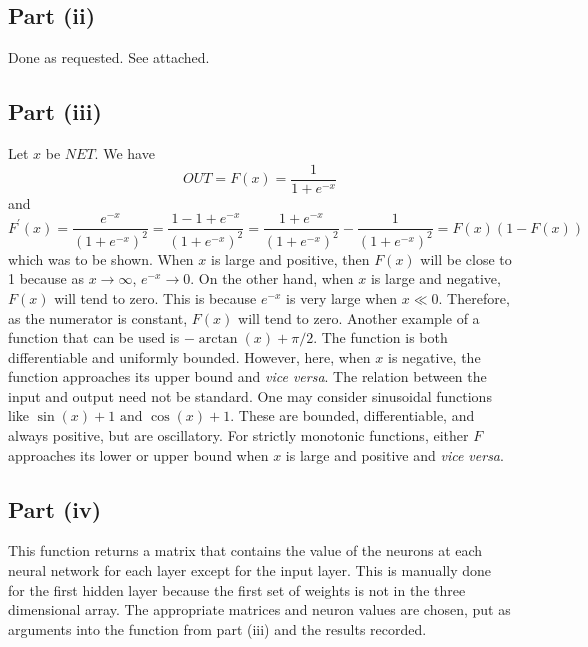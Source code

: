 \documentclass[12pt]{article}
\begin{document}
\subsection*{Part (ii)}
Done as requested.  
See attached.

\subsection*{Part (iii)}
Let $x$ be $NET$.
We have 
\[OUT = F(x) = \frac{1}{1+e^{-x}}\]
and
\[F^\prime(x) = \frac{e^{-x}}{(1+e^{-x})^2} = \frac{1-1+e^{-x}}{(1+e^{-x})^2} = \frac{1+e^{-x}}{(1+e^{-x})^2} -\frac{1}{(1+e^{-x})^2} = F(x)(1-F(x))\]
which was to be shown.
When $x$ is large and positive, then $F(x)$ will be close to 1 because as $x\rightarrow\infty$, $e^{-x}\rightarrow 0$.
On the other hand, when $x$ is large and negative, $F(x)$ will tend to zero.
This is because $e^{-x}$ is very large when $x\ll 0$.
Therefore, as the numerator is constant, $F(x)$ will tend to zero.
Another example of a function that can be used is $-\arctan\left(x\right) + \pi/2$.
The function is both differentiable and uniformly bounded.
However, here, when $x$ is negative, the function approaches its upper bound and \textit{vice versa}.
The relation between the input and output need not be standard.
One may consider sinusoidal functions like $\sin(x)+1 \text{ and }\cos(x)+1$.
These are bounded, differentiable, and always positive, but are oscillatory.
For strictly monotonic functions, either $F$ approaches its lower or upper bound when $x$ is large and positive and \textit{vice versa}.
\subsection*{Part (iv)}
This function returns a matrix that contains the value of the neurons at each neural network for each layer except for the input layer.
This is manually done for the first hidden layer because the first set of weights is not in the three dimensional array.
The appropriate matrices and neuron values are chosen, put as arguments into the function from part (iii) and the results recorded.
\end{document}
